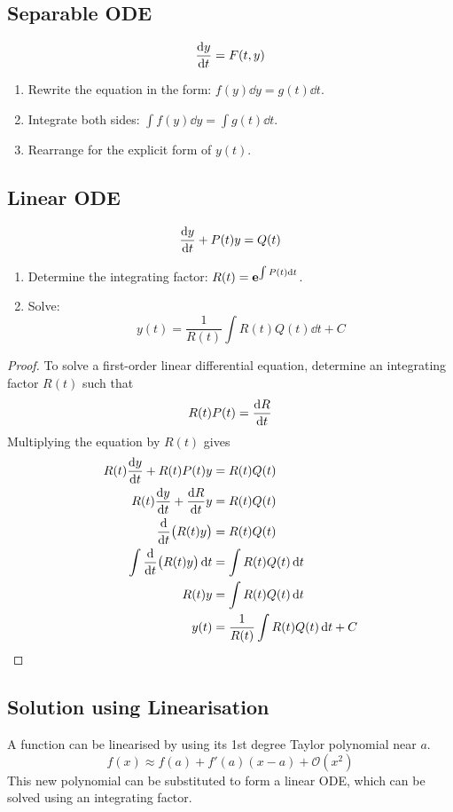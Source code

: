 \documentclass{article}
\begin{document}
\subsection{Separable ODE}
\begin{equation*}
    \dv{y}{t} = F(t, y)
\end{equation*}
\begin{enumerate}
    \item Rewrite the equation in the form: $f(y)\dd{y} = g(t)\dd{t}$.
    \item Integrate both sides: $\int f(y)\dd{y} = \int g(t)\dd{t}$.
    \item Rearrange for the explicit form of $y(t)$.
\end{enumerate}
\subsection{Linear ODE}
\begin{equation*}
    \dv{y}{t} + P(t)y = Q(t)
\end{equation*}
\begin{enumerate}
    \item Determine the integrating factor: $R(t)=\mathbf{e}^{\int P(t) \dd{t}}$.
    \item Solve:
    \begin{equation*}
        y(t)=\frac{1}{R(t)}\int R(t)Q(t)\dd{t} + C
    \end{equation*}
\end{enumerate}
\begin{proof}
    To solve a first-order linear differential equation, determine an integrating factor $R(t)$ such that
    \begin{equation*}
        R(t)P(t) = \dv{R}{t}
    \end{equation*}
    Multiplying the equation by $R(t)$ gives
    \begin{align*}
        R(t)\dv{y}{t} + R(t)P(t)y &= R(t)Q(t) \\
        R(t)\dv{y}{t} + \dv{R}{t}y &= R(t)Q(t) \\
        \dv{t}\bigl(R(t)y\bigr) &= R(t)Q(t) \\
        \int \dv{t}\bigl(R(t)y\bigr) \dd{t} &= \int R(t)Q(t) \dd{t} \\
        R(t)y &= \int R(t)Q(t) \dd{t} \\
        y(t) &= \frac{1}{R(t)}\int R(t)Q(t) \dd{t} + C
    \end{align*}
\end{proof}
\subsection{Solution using Linearisation}
A function can be linearised by using its 1st degree Taylor polynomial near $a$.
\begin{equation*}
    f(x) \approx f(a) + f'(a)(x-a) + \mathcal{O}(x^2)
\end{equation*}
This new polynomial can be substituted to form a linear ODE, which can be solved using an integrating factor.
\newpage
\end{document}
